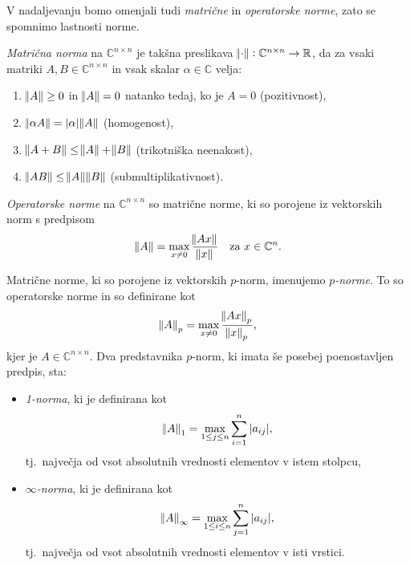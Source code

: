 \documentclass[mat1]{fmfdelo}
\newcommand{\R}{\mathbb R}
\newcommand{\C}{\mathbb C}
\begin{document}
V nadaljevanju bomo omenjali tudi \emph{matrične} in \emph{operatorske norme}, zato se spomnimo lastnosti norme.
\begin{definicija}
    \emph{Matrična norma} na $\C^{n \times n}$ je takšna preslikava $\norm{\cdot}: \C^{n \times n} \rightarrow \R$, da za vsaki matriki $A, B \in \C^{n \times n}$ in vsak skalar $\alpha \in \C$ velja:
    \begin{enumerate}
        \item $\norm{A} \geq 0$ in $\norm{A} = 0$ natanko tedaj, ko je $A = 0$ (pozitivnost),
        \item $\norm{\alpha A} = |\alpha|\norm{A}$ (homogenost),
        \item $\norm{A + B} \leq \norm{A} + \norm{B}$ (trikotniška neenakost), 
        \item $\norm{A B} \leq \norm{A} \norm{B}$ (submultiplikativnost).
    \end{enumerate}
    \emph{Operatorske norme} na $\C^{n\times n}$ so matrične norme, ki so porojene iz vektorskih norm s predpisom
    \begin{equation*}
        \norm{A} = \max_{x \neq 0} \frac{\norm{A x}}{\norm{x}}\quad \text{za}\ x\in \C^n.
    \end{equation*}
\end{definicija}
\begin{zgled}
    Matrične norme, ki so porojene iz vektorskih $p$-norm, imenujemo \emph{$p$-norme}. To so operatorske norme in so definirane kot
    \begin{equation*}
        \norm{A}_p = \max_{x \neq 0} \frac{\norm{A x}_p}{\norm{x}_p},
    \end{equation*}
    kjer je $A \in \C^{n\times n}$. Dva predstavnika $p$-norm, ki imata še posebej poenostavljen predpis, sta:
    \begin{itemize}
        \item \emph{1-norma}, ki je definirana kot
        \begin{equation*}
            \norm{A}_1 = \max_{1 \leq j \leq n} \sum_{i=1}^n |a_{ij}|,
        \end{equation*}
        tj.\ največja od vsot absolutnih vrednosti elementov v istem stolpcu,
        \item \emph{$\infty$-norma}, ki je definirana kot
        \begin{equation*}
            \norm{A}_\infty = \max_{1 \leq i \leq n} \sum_{j=1}^n |a_{ij}|,
        \end{equation*}
        tj.\ največja od vsot absolutnih vrednosti elementov v isti vrstici. \qedhere
    \end{itemize}
\end{zgled}
\end{document}
